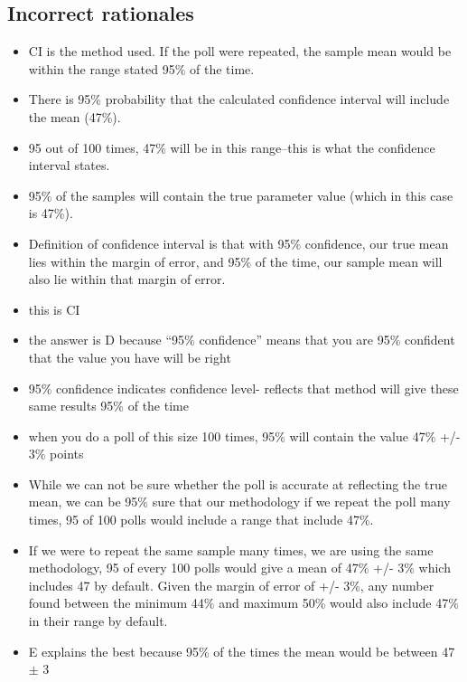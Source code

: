 \documentclass[letterpaper,12pt,twoside,printwatermark=false]{pinp}
\providecommand{\tightlist}{%
  \setlength{\itemsep}{0pt}\setlength{\parskip}{0pt}}
\begin{document}
\hypertarget{incorrect-rationales-5}{%
\subsection{Incorrect rationales}\label{incorrect-rationales-5}}

\begin{itemize}
\tightlist
\item
  CI is the method used. If the poll were repeated, the sample mean
  would be within the range stated 95\% of the time.
\item
  There is 95\% probability that the calculated confidence interval will
  include the mean (47\%).
\item
  95 out of 100 times, 47\% will be in this range--this is what the
  confidence interval states.
\item
  95\% of the samples will contain the true parameter value (which in
  this case is 47\%).
\item
  Definition of confidence interval is that with 95\% confidence, our
  true mean lies within the margin of error, and 95\% of the time, our
  sample mean will also lie within that margin of error.
\item
  this is CI
\item
  the answer is D because ``95\% confidence'' means that you are 95\%
  confident that the value you have will be right
\item
  95\% confidence indicates confidence level- reflects that method will
  give these same results 95\% of the time
\item
  when you do a poll of this size 100 times, 95\% will contain the value
  47\% +/- 3\% points
\item
  While we can not be sure whether the poll is accurate at reflecting
  the true mean, we can be 95\% sure that our methodology if we repeat
  the poll many times, 95 of 100 polls would include a range that
  include 47\%.
\item
  If we were to repeat the same sample many times, we are using the same
  methodology, 95 of every 100 polls would give a mean of 47\% +/- 3\%
  which includes 47 by default. Given the margin of error of +/- 3\%,
  any number found between the minimum 44\% and maximum 50\% would also
  include 47\% in their range by default.
\item
  E explains the best because 95\% of the times the mean would be
  between 47 \(\pm\) 3
\end{itemize}





\end{document}
